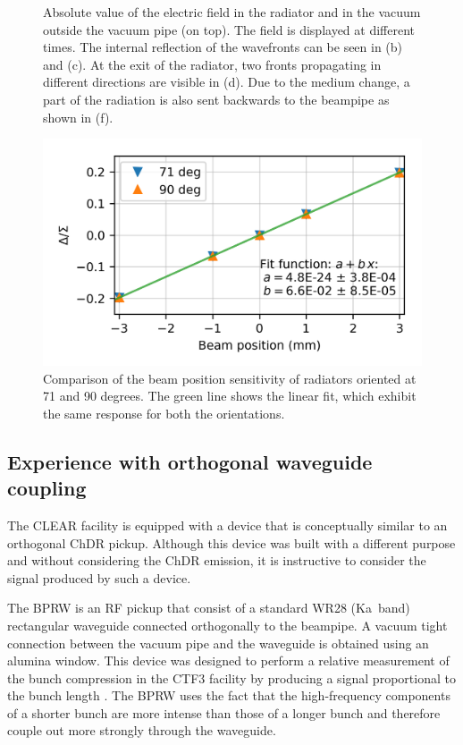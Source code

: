 \begin{figure}[!h]
\caption{Absolute value of the electric field in the radiator and in the vacuum outside the vacuum pipe (on top). The field is displayed at different times. The internal reflection of the wavefronts can be seen in (b) and (c). At the exit of the radiator, two fronts propagating in different directions are visible in (d). Due to the medium change, a part of the radiation is also sent backwards to the beampipe as shown in (f).}
\label{fig:90deg_propagation}

\vspace{3mm}
\includegraphics[scale=1., keepaspectratio]{pictures/90vs71}
\caption{Comparison of the beam position sensitivity of radiators oriented at 71 and 90 degrees. The green line shows the linear fit, which exhibit the same response for both the orientations.}
\label{fig:90deg_vs_71deg}

\end{figure}




\newpage

\subsection[Experience with orthogonal waveguide coupling]{Experience with orthogonal waveguide coupling}

The CLEAR facility is equipped with a device that is conceptually similar to an orthogonal ChDR pickup. Although this device was built with a different purpose and without considering the ChDR emission, it is instructive to consider the signal produced by such a device. 

The BPRW \cite{BPRW:linac2010} is an RF pickup that consist of a standard WR28 (Ka~band) rectangular waveguide connected orthogonally to the beampipe. A vacuum tight connection between the vacuum pipe and the waveguide is obtained using an alumina window. This device was designed to perform a relative measurement of the bunch compression in the CTF3 facility \cite{CTF3} by producing a signal proportional to the bunch length \cite{Lefevre:2008zz}. The BPRW uses the fact that the high-frequency components of a shorter bunch are more intense than those of a longer bunch and therefore couple out more strongly through the waveguide. 

